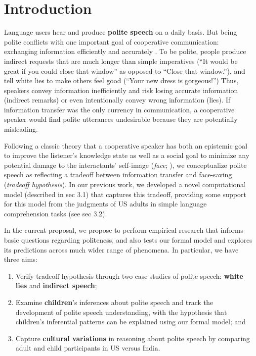 \section{Introduction}\label{sec:intro}

Language users hear and produce {\bf polite speech} on a daily basis. But being polite conflicts with one important goal of cooperative communication: exchanging information efficiently and accurately \citep{Grice1975}. To be polite, people produce indirect requests that are much longer than simple imperatives (``It would be great if you could close that window'' as opposed to ``Close that window.''), and tell white lies to make others feel good (``Your new dress is gorgeous!'') Thus, speakers convey information inefficiently and risk losing accurate information (indirect remarks) or even intentionally convey wrong information (lies). If information transfer was the only currency in communication, a cooperative speaker would find polite utterances undesirable because they are potentially misleading. 

Following a classic theory that a cooperative speaker has both an epistemic goal to improve the listener's knowledge state as well as a social goal to minimize any potential damage to the interactants' self-image (\emph{face}; \citealt{Brown1987}), we conceptualize polite speech as reflecting a tradeoff between information transfer and face-saving (\emph{tradeoff hypothesis}). In our previous work, we developed a novel computational model (described in sec 3.1) that captures this tradeoff, providing some support for this model from the judgments of US adults in simple language comprehension tasks (see sec 3.2).

In the current proposal, we propose to perform empirical research that informs basic questions regarding politeness, and also tests our formal model and explores its predictions across much wider range of phenomena. In particular, we have three aims:

\begin{enumerate}

\item Verify tradeoff hypothesis through two case studies of polite speech: {\bf white lies} and {\bf indirect speech};

\item Examine {\bf children}'s inferences about polite speech and track the development of polite speech understanding, with the hypothesis that children's inferential patterns can be explained using our formal model; and

\item Capture {\bf cultural variations} in reasoning about polite speech by comparing adult and child participants in US versus India.

\end{enumerate}


